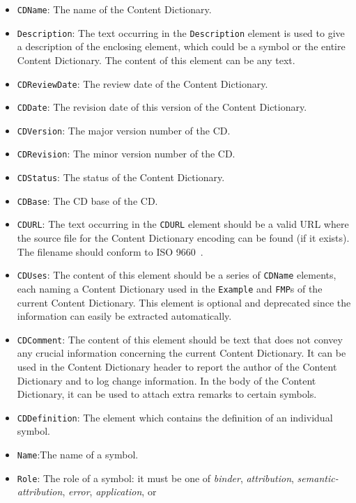 \begin{itemize}
\item \lstinline|CDName|: The name of the Content Dictionary.
\item \lstinline|Description|: The text occurring in the \lstinline|Description| element
  is used to give a description of the enclosing element, which could be a symbol or the
  entire Content Dictionary. The content of this element can be any \XML text.
\item \lstinline|CDReviewDate|: The review date of the Content Dictionary.
\item \lstinline|CDDate|: The revision date of this version of the Content Dictionary.
\item \lstinline|CDVersion|: The major version number of the CD.
\item \lstinline|CDRevision|: The minor version number of the CD.
\item \lstinline|CDStatus|: The status of the Content Dictionary.
\item \lstinline|CDBase|: The CD base of the CD.
\item \lstinline|CDURL|: The text occurring in the \lstinline|CDURL| element should be a
  valid URL where the source file for the Content Dictionary encoding can be found (if it
  exists). The filename should conform to ISO 9660~\cite{iso9660}.
\item \lstinline|CDUses|: The content of this element should be a series of
  \lstinline|CDName| elements, each naming a Content Dictionary used in the
  \lstinline|Example| and \lstinline|FMP|s of the current Content Dictionary. This
  element is optional and deprecated since the information can easily be extracted
  automatically.
\item \lstinline|CDComment|: The content of this element should be text that does not
  convey any crucial information concerning the current Content Dictionary. It can be used
  in the Content Dictionary header to report the author of the Content Dictionary and to
  log change information. In the body of the Content Dictionary, it can be used to attach
  extra remarks to certain symbols.
\item \lstinline|CDDefinition|: The element which contains the definition of an
  individual symbol.
\item \lstinline|Name|:The name of a symbol.
\item \lstinline|Role|: The role of a symbol: it must be one of \emph{binder},
  \emph{attribution}, \emph{semantic-attribution}, \emph{error}, \emph{application}, or

\end{itemize}
